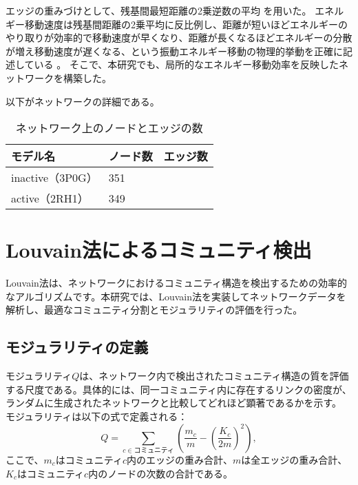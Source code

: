 エッジの重みづけとして、残基間最短距離の2乗逆数の平均\langle {} \rangle を用いた。
エネルギー移動速度は残基間距離の2乗平均に反比例し、距離が短いほどエネルギーのやり取りが効率的で移動速度が早くなり、距離が長くなるほどエネルギーの分散が増え移動速度が遅くなる、という振動エネルギー移動の物理的挙動を正確に記述している \cite{acs2025}。
そこで、本研究でも、局所的なエネルギー移動効率を反映したネットワークを構築した。


以下がネットワークの詳細である。
\begin{table}[!ht]
    \centering
    \caption{ネットワーク上のノードとエッジの数}
    \begin{tabular}{lll}
      \hline
      モデル名          & ノード数  & エッジ数 \\
      \hline 
      inactive（3P0G）  &  351 &  \\ 
      active（2RH1）    &  349 &  \\ 
    \end{tabular}
    \label{tab:system_size}
  \end{table}



\section{Louvain法によるコミュニティ検出}

Louvain法は、ネットワークにおけるコミュニティ構造を検出するための効率的なアルゴリズムです。本研究では、Louvain法を実装してネットワークデータを解析し、最適なコミュニティ分割とモジュラリティの評価を行った。
\subsection{モジュラリティの定義}
モジュラリティ$Q$は、ネットワーク内で検出されたコミュニティ構造の質を評価する尺度である。具体的には、同一コミュニティ内に存在するリンクの密度が、ランダムに生成されたネットワークと比較してどれほど顕著であるかを示す。
モジュラリティは以下の式で定義される：
\begin{equation}
Q = \sum_{c \in \text{コミュニティ}} \left( \frac{m_c}{m} - \left( \frac{K_c}{2m} \right)^2 \right),
\end{equation}
ここで、$m_c$はコミュニティ$c$内のエッジの重み合計、$m$は全エッジの重み合計、$K_c$はコミュニティ$c$内のノードの次数の合計である。


